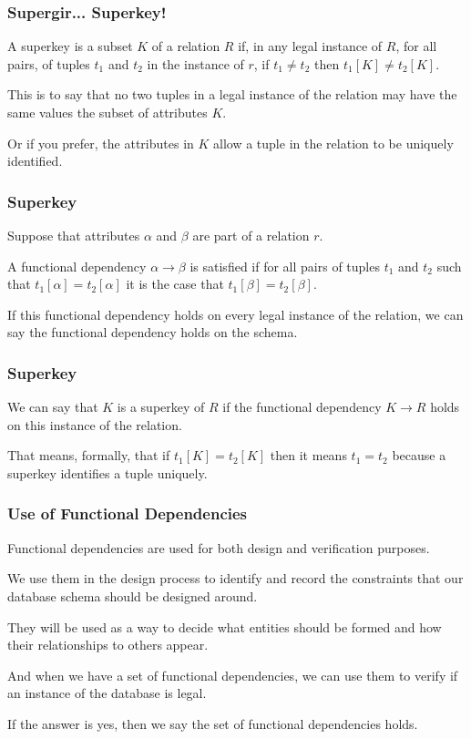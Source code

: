 \begin{frame}
\frametitle{Supergir... Superkey!}

A \alert{superkey} is a subset $K$ of a relation $R$ if, in any legal instance of $R$, for all pairs, of tuples $t_{1}$ and $t_{2}$ in the instance of $r$, if $t_{1} \neq t_{2}$ then $t_{1}[K] \neq t_{2}[K]$. 

This is to say that no two tuples in a legal instance of the relation may have the same values the subset of attributes $K$.

Or if you prefer, the attributes in $K$ allow a tuple in the relation to be uniquely identified.

\end{frame}


\begin{frame}
\frametitle{Superkey}

Suppose that attributes $\alpha$ and $\beta$ are part of a relation $r$. 

A functional dependency $\alpha \rightarrow \beta$ is satisfied if for all pairs of tuples $t_{1}$ and $t_{2}$ such that $t_{1}[\alpha] = t_{2}[\alpha]$ it is the case that $t_{1}[\beta] = t_{2}[\beta]$. 

If this functional dependency holds on every legal instance of the relation, we can say the functional dependency holds on the schema.

\end{frame}



\begin{frame}
\frametitle{Superkey}

We can say that $K$ is a superkey of $R$ if the functional dependency $K \rightarrow R$ holds on this instance of the relation. 

That means, formally, that if $t_{1}[K] = t_{2}[K]$ then it means $t_{1} = t_{2}$ because a superkey identifies a tuple uniquely.


\end{frame}



\begin{frame}
\frametitle{Use of Functional Dependencies}

Functional dependencies are used for both design and verification purposes. 

We use them in the design process to identify and record the constraints that our database schema should be designed around. 

They will be used as a way to decide what entities should be formed and how their relationships to others appear. 

And when we have a set of functional dependencies, we can use them to verify if an instance of the database is legal.

If the answer is yes, then we say the set of functional dependencies holds.

\end{frame}


